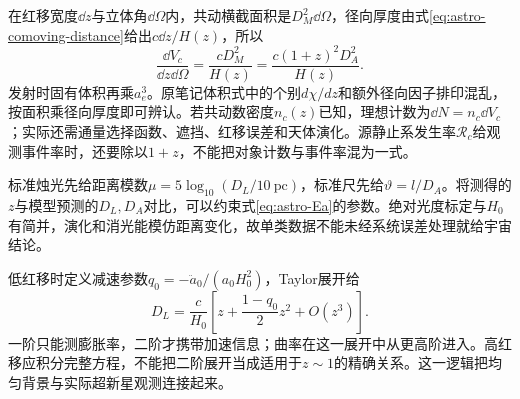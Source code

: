 在红移宽度$\dd z$与立体角$\dd\Omega$内，共动横截面积是$D_M^2\dd\Omega$，径向厚度由式\eqref{eq:astro-comoving-distance}给出$c\dd z/H(z)$，所以
\[
 \frac{\dd V_c}{\dd z\dd\Omega}=\frac{cD_M^2}{H(z)}
 =\frac{c(1+z)^2D_A^2}{H(z)}.
\]
发射时固有体积再乘$a_e^3$。原笔记体积式中的个别$d\chi/dz$和额外径向因子排印混乱，按面积乘径向厚度即可辨认。若共动数密度$n_c(z)$已知，理想计数为$\dd N=n_c\dd V_c$；实际还需通量选择函数、遮挡、红移误差和天体演化。源静止系发生率$\mathcal R_c$给观测事件率时，还要除以$1+z$，不能把对象计数与事件率混为一式。

标准烛光先给距离模数$\mu=5\log_{10}(D_L/10\ \mathrm{pc})$，标准尺先给$\vartheta=l/D_A$。将测得的$z$与模型预测的$D_L,D_A$对比，可以约束式\eqref{eq:astro-Ea}的参数。绝对光度标定与$H_0$有简并，演化和消光能模仿距离变化，故单类数据不能未经系统误差处理就给宇宙结论。

低红移时定义减速参数$q_0=-\ddot a_0/(a_0H_0^2)$，Taylor展开给
\[
 D_L=\frac c{H_0}\left[z+\frac{1-q_0}{2}z^2+O(z^3)\right].
\]
一阶只能测膨胀率，二阶才携带加速信息；曲率在这一展开中从更高阶进入。高红移应积分完整方程，不能把二阶展开当成适用于$z\sim1$的精确关系。这一逻辑把均匀背景与实际超新星观测连接起来。

